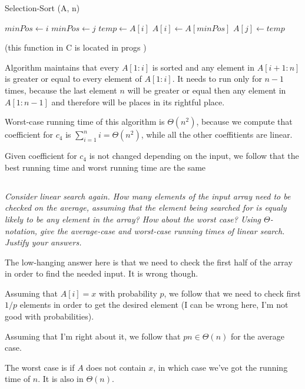 \documentclass[11pt,oneside,titlepage]{book}
\begin{document}
\begin{function}
  \caption{Selection-Sort (A, n)}
   {
    $minPos \leftarrow i$\;
     {
       {
        $minPos \leftarrow j$
      }
    }
    $temp \leftarrow A[i]$\;
    $A[i] \leftarrow A[minPos]$\;
    $A[j] \leftarrow temp$\;
  }
\end{function}

(this function in C is located in progs )

Algorithm maintains that every $A[1:i]$ is sorted and any element in  $A[i + 1:n]$ is greater
or equal to every element of $A[1:i]$. It needs to run only for $n - 1$ times, because the last
element $n$ will be greater or equal then any element in $A[1:n - 1]$ and therefore will
be places in its rightful place.

Worst-case running time of this algorithm is $\Theta(n^2)$, because we compute that
coefficient for $c_4$ is $\sum_{i = 1}^n i = \Theta(n^2)$, while all the other coeffitients
are linear.

Given coefficient for $c_4$ is not changed depending on the input, we follow that
the best running time and worst running time are the same

\subsection{}

\textit{Consider linear search again. How many elements of the input array need to be checked on
  the average, assuming that the element being searched for is equaly likely to be any element
  in the array? How about the worst case? Using $\Theta$-notation, give the average-case and
  worst-case running times of linear search. Justify your answers.}

The low-hanging answer here is that we need to check the first half of the array in order to
find the needed input. It is wrong though.

Assuming that $A[i] = x$ with probability $p$, we follow that we need to check first
$1/p$ elements in order to get the desired element (I can be wrong here, I'm not good with
probabilities).

Assuming that I'm right about it, we follow that $pn \in \Theta(n)$ for the average case.

The worst case is if $A$ does not contain $x$, in which case we've got the
running time of $n$. It is also in $\Theta(n)$.

\subsection{}
\end{document}
